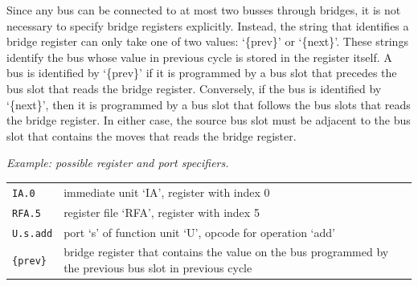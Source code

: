 \documentclass[a4paper,twoside]{tceusermanual}
\begin{document}
Since any bus can be connected to at most two busses through bridges, it is
not necessary to specify bridge registers explicitly.  Instead, the string
that identifies a bridge register can only take one of two values:
`\{prev\}' or `\{next\}'.  These strings identify the bus whose value in
previous cycle is stored in the register itself.  A bus is identified by
`\{prev\}' if it is programmed by a bus slot that precedes the bus slot that
reads the bridge register.  Conversely, if the bus is identified by
`\{next\}', then it is programmed by a bus slot that follows the bus slots
that reads the bridge register.  In either case, the source bus slot must be
adjacent to the bus slot that contains the moves that reads the bridge
register.

\emph{Example: possible register and port specifiers.}


\begin{tabular}{lp{}}
\texttt{IA.0}    & immediate unit `IA', register with index 0\\
\texttt{RFA.5}   & register file `RFA', register with index 5\\
\texttt{U.s.add} & port `s' of function unit `U', opcode for operation
`add'\\
\verb|{|\texttt{prev}\verb|}|  & bridge register that contains the value on
the
                   bus programmed by the previous bus slot in previous
cycle\\
\end{tabular}
\end{document}
